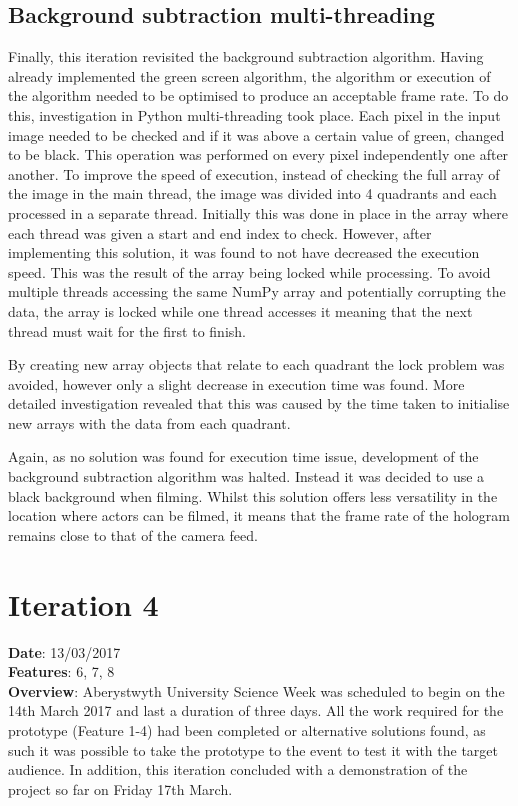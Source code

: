 \subsection{Background subtraction multi-threading}
Finally, this iteration revisited the background subtraction algorithm. Having already implemented the green screen algorithm, the algorithm or execution of the algorithm needed to be optimised to produce an acceptable frame rate. To do this, investigation in Python multi-threading took place. Each pixel in the input image needed to be checked and if it was above a certain value of green, changed to be black. This operation was performed on every pixel independently one after another. To improve the speed of execution, instead of checking the full array of the image in the main thread, the image was divided into 4 quadrants and each processed in a separate thread. Initially this was done in place in the array where each thread was given a start and end index to check. However, after implementing this solution, it was found to not have decreased the execution speed. This was the result of the array being locked while processing. To avoid multiple threads accessing the same NumPy array and potentially corrupting the data, the array is locked while one thread accesses it meaning that the next thread must wait for the first to finish. 

By creating new array objects that relate to each quadrant the lock problem was avoided, however only a slight decrease in execution time was found. More detailed investigation revealed that this was caused by the time taken to initialise new arrays with the data from each quadrant.

Again, as no solution was found for execution time issue, development of the background subtraction algorithm was halted. Instead it was decided to use a black background when filming. Whilst this solution offers less versatility in the location where actors can be filmed, it means that the frame rate of the hologram remains close to that of the camera feed. 

  
\newpage

\section{Iteration 4}
\textbf{Date}: 13/03/2017 \\
\textbf{Features}: 6, 7, 8 \\
\textbf{Overview}: Aberystwyth University Science Week was scheduled to begin on the 14th March 2017 and last a duration of three days. All the work required for the prototype (Feature 1-4) had been completed or alternative solutions found, as such it was possible to take the prototype to the event to test it with the target audience. In addition, this iteration concluded with a demonstration of the project so far on Friday 17th March. 

